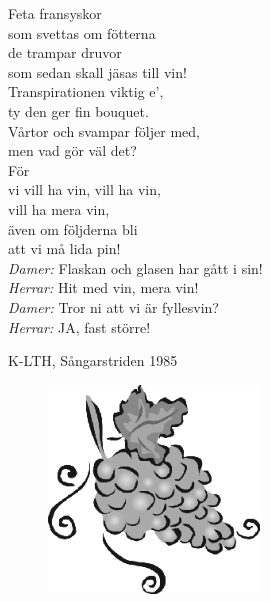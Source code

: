 \documentclass[a6paper, 10pt, twoside]{article}
\begin{document}
\noindent
\begin{center}
\end{center}
\begin{lyrics}
Feta fransyskor \\
som svettas om fötterna\\
de trampar druvor \\
som sedan skall jäsas till vin!\\
Transpirationen viktig e', \\
ty den ger fin bouquet.\\
Vårtor och svampar följer med, \\
men vad gör väl det?\\
För \\
vi vill ha vin, vill ha vin, \\
vill ha mera vin,\\
även om följderna bli\\
att vi må lida pin!
\vspace{5pt}\\
\textit{Damer:} Flaskan och glasen har gått i sin!\\
\textit{Herrar:} Hit med vin, mera vin!\\
\textit{Damer:} Tror ni att vi är fyllesvin?\\
\textit{Herrar:} JA, fast större! 
\end{lyrics}
\begin{flushright}
K-LTH, Sångarstriden 1985
\end{flushright}
\vfill
\begin{figure}[!h]
\includegraphics[width=0.5\textwidth]{grapes.png}
\end{figure}
\end{document}
